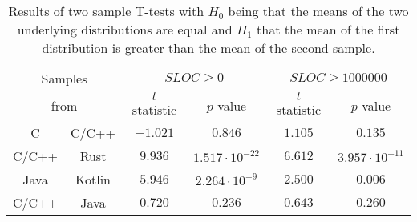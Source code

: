 \begin{table}[tbh!]
	\centering
	\begin{tabular}{|cc||c|c||c|c|}
		\hline
		\multicolumn{2}{|c|}{Samples} & \multicolumn{2}{|c|}{$SLOC \geq 0$} & \multicolumn{2}{|c|}{$SLOC \geq 1000000$}  \\
		\multicolumn{2}{|c|}{from} & \multicolumn{1}{c}{$t$ statistic} & \multicolumn{1}{c|}{$p$ value} & \multicolumn{1}{c}{$t$ statistic} & $p$ value \\
		\hline
		\hline
		C & C/C++ & $-1.021$ & $0.846$ & $1.105$ & $0.135$ \\
		\hline
		\hline
		C/C++ & Rust & $9.936$ & $1.517 \cdot 10^{-22}$ & $6.612$ & $3.957 \cdot 10^{-11}$ \\
		\hline
		Java & Kotlin & $5.946$ & $2.264 \cdot 10^{-9}$ & $2.500$ & $0.006$ \\
		\hline
		\hline
		C/C++ & Java & $0.720$ & $0.236$ & $0.643$ & $0.260$ \\
		\hline
	\end{tabular}
	\caption{Results of two sample T-tests with $H_0$ being that the means of the two underlying distributions are equal and $H_1$ that the mean of the first distribution is greater than the mean of the second sample.}
	\label{tab:stat_test}
\end{table}


